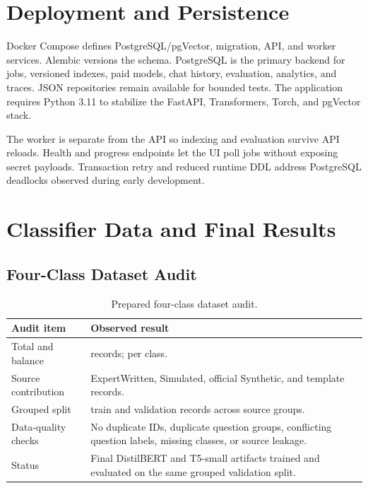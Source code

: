 
\section{Deployment and Persistence}

Docker Compose defines PostgreSQL/pgVector, migration, API, and worker services.
Alembic versions the schema. PostgreSQL is the primary backend for jobs,
versioned indexes, paid models, chat history, evaluation, analytics, and traces.
JSON repositories remain available for bounded tests. The application requires
Python 3.11 to stabilize the FastAPI, Transformers, Torch, and pgVector stack.

The worker is separate from the API so indexing and evaluation survive API
reloads. Health and progress endpoints let the UI poll jobs without exposing
secret payloads. Transaction retry and reduced runtime DDL address PostgreSQL
deadlocks observed during early development.

\section{Classifier Data and Final Results}

\subsection{Four-Class Dataset Audit}

\begin{table}[H]
  \centering
  \caption{Prepared four-class dataset audit.}
  \label{tab:dataset-audit}
  \begin{tabularx}{\textwidth}{p{}X}
    \toprule
    Audit item & Observed result\\
    \midrule
    Total and balance & \PreparedDatasetRecords{} records;
    \PreparedDatasetPerClass{} per class.\\
    Source contribution & \PreparedOfficialExpertRecords{} ExpertWritten,
    \PreparedOfficialSimulatedRecords{} Simulated,
    \PreparedOfficialSyntheticRecords{} official Synthetic, and
    \PreparedTemplateRecords{} template records.\\
    Grouped split & \PreparedTrainRecords{} train and
    \PreparedValidationRecords{} validation records across
    \PreparedSourceGroups{} source groups.\\
    Data-quality checks & No duplicate IDs, duplicate question groups,
    conflicting question labels, missing classes, or source leakage.\\
    Status & Final DistilBERT and T5-small artifacts trained and evaluated on
    the same grouped validation split.\\
    \bottomrule
  \end{tabularx}
\end{table}

